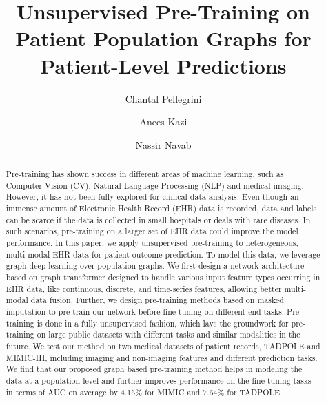 \documentclass[runningheads]{llncs}
\begin{document}
\title{Unsupervised Pre-Training on Patient Population Graphs for Patient-Level Predictions}


\author{Chantal Pellegrini \and
Anees Kazi \and
Nassir Navab}



\maketitle              

\begin{abstract}

Pre-training has shown success in different areas of machine learning, such as Computer Vision (CV), Natural Language Processing (NLP) and medical imaging. However, it has not been fully explored for clinical data analysis. Even though an immense amount of Electronic Health Record (EHR) data is recorded, data and labels can be scarce if the data is collected in small hospitals or deals with rare diseases. In such scenarios, pre-training on a larger set of EHR data could improve the model performance. In this paper, we apply unsupervised pre-training to heterogeneous, multi-modal EHR data for patient outcome prediction. To model this data, we leverage graph deep learning over population graphs. We first design a network architecture based on graph transformer designed to handle various input feature types occurring in EHR data, like continuous, discrete, and time-series features, allowing better multi-modal data fusion. Further, we design pre-training methods based on masked imputation to pre-train our network before fine-tuning on different end tasks. Pre-training is done in a fully unsupervised fashion, which lays the groundwork for pre-training on large public datasets with different tasks and similar modalities in the future. We test our method on two medical datasets of patient records, TADPOLE and MIMIC-III, including imaging and non-imaging features and different prediction tasks. We find that our proposed graph based pre-training method helps in modeling the data at a population level and further improves performance on the fine tuning tasks in terms of AUC on average by 4.15\% for MIMIC and 7.64\% for TADPOLE.

\end{abstract}
\end{document}
